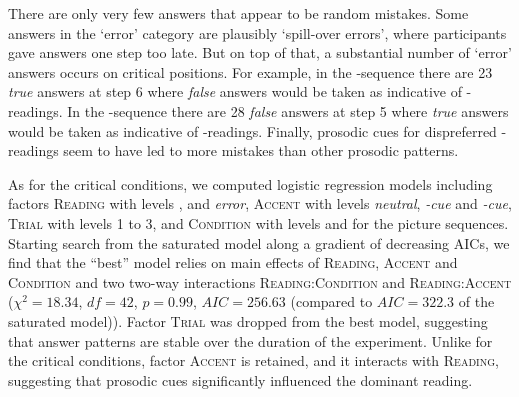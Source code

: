 \documentclass[fleqn,reqno,10pt]{article}
\newcommand{\lc}{\acro{lc}}
\newcommand{\ec}{\acro{ec}}
\begin{document}



There are only very few answers that appear to be random
mistakes. Some answers in the `error' category are plausibly
`spill-over errors', where participants gave answers one step too
late. But on top of that, a substantial number of `error' answers
occurs on critical positions. For example, in the \lc-sequence there
are 23 \emph{true} answers at step 6 where \emph{false} answers would
be taken as indicative of \ec-readings. In the \ec-sequence there are
28 \emph{false} answers at step 5 where \emph{true} answers would be
taken as indicative of \lc-readings. Finally, prosodic cues for
dispreferred \ec-readings seem to have led to more mistakes than
other prosodic patterns.

As for the critical conditions, we computed logistic regression models
including factors \textsc{Reading} with levels \lc, \ec and
\emph{error}, \textsc{Accent} with levels \emph{neutral},
\emph{\lc-cue} and \emph{\ec-cue}, \textsc{Trial} with levels 1 to
3, and \textsc{Condition} with levels \lc and \ec for the picture
sequences. Starting search from the saturated model along a gradient
of decreasing AICs, we find that the ``best'' model relies on main
effects of \textsc{Reading}, \textsc{Accent} and \textsc{Condition}
and two two-way interactions \textsc{Reading:Condition} and
\textsc{Reading:Accent} ($\chi^2=18.34$, $df=42$, $p=0.99$,
$AIC=256.63$ (compared to $AIC=322.3$ of the saturated model)). Factor
\textsc{Trial} was dropped from the best model, suggesting that
answer patterns are stable over the duration of the experiment. Unlike
for the critical conditions, factor \textsc{Accent} is retained, and
it interacts with \textsc{Reading}, suggesting that prosodic cues
significantly influenced the dominant reading.
\end{document}
